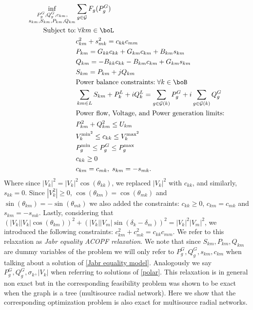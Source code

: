 \documentclass[11pt,a4paper,oneside,openany]{book}
\numberwithin{definition}{section}
\numberwithin{theorem}{section}
\numberwithin{problem}{section}
\begin{document}
\begin{align}
\label{Jabr equality model}
\inf_{\substack{P^G_g, Q^G_g, c_{km}, \\ s_{km}, S_{km}, P_{km}, Q_{km}}} & \sum_{g \in \mathcal{G}}{F_g(P_g^G)} \\
\text{Subject to:} & \; \forall km \in \boL \nonumber \\
& c_{km}^2 + s_{mk}^2 = c_{kk}c_{mm}\\
& P_{km} = G_{kk}c_{kk}+G_{km}c_{km}+B_{km}s_{km} \label{c to P} \\
& Q_{km} = -B_{kk}c_{kk}-B_{km}c_{km}+G_{km}s_{km} \label{c to Q}\\
& S_{km} = P_{km} + jQ_{km} \label{PQ to S}\\
& \text{Power balance constraints:}\; \forall k \in \boB\nonumber \\
& \sum_{km \in L}S_{km}+P_k^L+iQ_k^L = \sum_{g \in \mathcal{G}(k)}{P_g^G} + i\sum_{g \in \mathcal{G}(k)}{Q_g^G} \label{Power Flow Constraint J}\\
& \text{Power flow, Voltage, and Power generation limits:} \nonumber \\
& P_{km}^2 + Q_{km}^2 \leq U_{km} \label{Power Flow Magnitude Constraint J}\\
& V_k^{\text{min}^2} \leq c_{kk} \leq V_k^{\text{max}^2} \label{Voltage Magnitude Constraint J} \\
& P_g^{\text{min}} \leq P_g^G \leq P_g^{\text{max}}\label{Power generation Magnitude Constraint J} \\
& c_{kk} \geq 0 \; \\ 
& c_{km} = c_{mk}, \;s_{km} = - s_{mk}.
\end{align}
Where since $|V_k|^2 = |V_k|^2\cos(\theta_{kk})$, we replaced $|V_k|^2$ with $c_{kk}$, and similarly, $s_{kk} = 0$. Since \(|V_k^2| \geq 0 \), \(\cos(\theta_{km}) = \cos(\theta_{mk})\) and \(\sin(\theta_{km})= -\sin(\theta_{mk})\) we also added the constraints: $c_{kk} \geq 0$, $c_{km} = c_{mk}$ and $s_{km}=-s_{mk}$.
Lastly, considering that $(|V_k||V_k|\cos(\theta_{km}))^2 + (|V_k||V_m|\sin(\delta_k-\delta_m))^2 = |V_k|^2|V_m|^2$, we introduced the following constraints: $c_{km}^2 + c_{mk}^2 = c_{kk}c_{mm}$. We refer to this relaxation as \emph{Jabr equality ACOPF relaxation}.
We note that since $S_{km},P_{km},Q_{km}$ are dummy variables of the problem we will only refer to $P_g^G,Q_g^G,s_{km},c_{km}$ when talking about a solution of \eqref{Jabr equality model}. Analogously we say $P^G_g,Q^G_g, \sigma_k, |V_k|$ when referring to solutions of \eqref{polar}. This  relaxation is in general non exact but in \cite{jabr} the corresponding feasibility problem was shown to be exact when the graph is a tree (multisource radial network). Here we show that the corresponding optimization problem is also exact for multisource radial networks.
\end{document}
